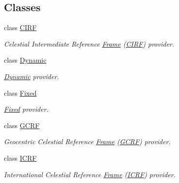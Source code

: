 \subsection*{Classes}
\begin{DoxyCompactItemize}
\item 
class \hyperlink{classlibrary_1_1physics_1_1coord_1_1frame_1_1provider_1_1_c_i_r_f}{C\+I\+RF}
\begin{DoxyCompactList}\small\item\em Celestial Intermediate Reference \hyperlink{classlibrary_1_1physics_1_1coord_1_1_frame}{Frame} (\hyperlink{classlibrary_1_1physics_1_1coord_1_1frame_1_1provider_1_1_c_i_r_f}{C\+I\+RF}) provider. \end{DoxyCompactList}\item 
class \hyperlink{classlibrary_1_1physics_1_1coord_1_1frame_1_1provider_1_1_dynamic}{Dynamic}
\begin{DoxyCompactList}\small\item\em \hyperlink{classlibrary_1_1physics_1_1coord_1_1frame_1_1provider_1_1_dynamic}{Dynamic} provider. \end{DoxyCompactList}\item 
class \hyperlink{classlibrary_1_1physics_1_1coord_1_1frame_1_1provider_1_1_fixed}{Fixed}
\begin{DoxyCompactList}\small\item\em \hyperlink{classlibrary_1_1physics_1_1coord_1_1frame_1_1provider_1_1_fixed}{Fixed} provider. \end{DoxyCompactList}\item 
class \hyperlink{classlibrary_1_1physics_1_1coord_1_1frame_1_1provider_1_1_g_c_r_f}{G\+C\+RF}
\begin{DoxyCompactList}\small\item\em Geocentric Celestial Reference \hyperlink{classlibrary_1_1physics_1_1coord_1_1_frame}{Frame} (\hyperlink{classlibrary_1_1physics_1_1coord_1_1frame_1_1provider_1_1_g_c_r_f}{G\+C\+RF}) provider. \end{DoxyCompactList}\item 
class \hyperlink{classlibrary_1_1physics_1_1coord_1_1frame_1_1provider_1_1_i_c_r_f}{I\+C\+RF}
\begin{DoxyCompactList}\small\item\em International Celestial Reference \hyperlink{classlibrary_1_1physics_1_1coord_1_1_frame}{Frame} (\hyperlink{classlibrary_1_1physics_1_1coord_1_1frame_1_1provider_1_1_i_c_r_f}{I\+C\+RF}) provider. \end{DoxyCompactList}\item 

\end{DoxyCompactItemize}
